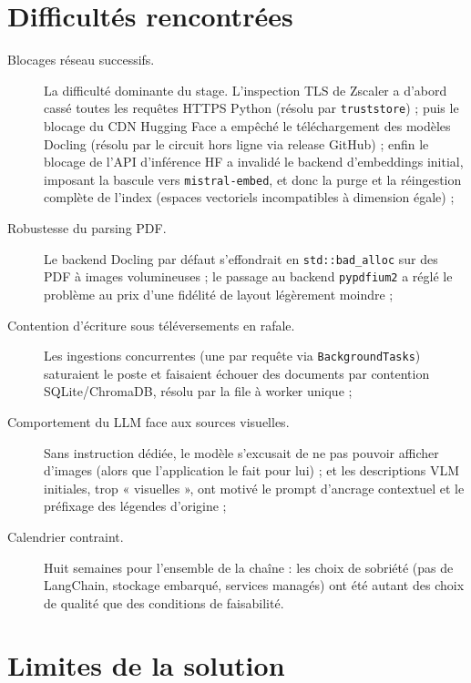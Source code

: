 \section{Difficultés rencontrées}
\label{sec:difficultes}

\begin{description}
  \item[Blocages réseau successifs.] La difficulté dominante du stage. L'inspection TLS de
    Zscaler a d'abord cassé toutes les requêtes HTTPS Python (résolu par
    \texttt{truststore}) ; puis le blocage du CDN Hugging Face a empêché le téléchargement
    des modèles Docling (résolu par le circuit hors ligne via release GitHub) ; enfin le
    blocage de l'API d'inférence HF a invalidé le backend d'embeddings initial, imposant
    la bascule vers \texttt{mistral-embed}, et donc la purge et la réingestion complète de
    l'index (espaces vectoriels incompatibles à dimension égale) ;
  \item[Robustesse du parsing PDF.] Le backend Docling par défaut s'effondrait en
    \texttt{std::bad\_alloc} sur des PDF à images volumineuses ; le passage au backend
    \texttt{pypdfium2} a réglé le problème au prix d'une fidélité de layout légèrement
    moindre ;
  \item[Contention d'écriture sous téléversements en rafale.] Les ingestions concurrentes
    (une par requête via \texttt{BackgroundTasks}) saturaient le poste et faisaient
    échouer des documents par contention SQLite/ChromaDB, résolu par la file à worker
    unique ;
  \item[Comportement du LLM face aux sources visuelles.] Sans instruction dédiée, le
    modèle s'excusait de ne pas pouvoir afficher d'images (alors que l'application le fait
    pour lui) ; et les descriptions VLM initiales, trop « visuelles », ont motivé le
    prompt d'ancrage contextuel et le préfixage des légendes d'origine ;
  \item[Calendrier contraint.] Huit semaines pour l'ensemble de la chaîne : les choix de
    sobriété (pas de LangChain, stockage embarqué, services managés) ont été autant des
    choix de qualité que des conditions de faisabilité.
\end{description}

\section{Limites de la solution}
\label{sec:limites}


